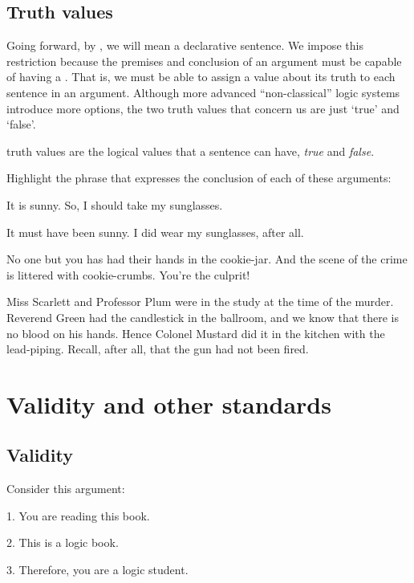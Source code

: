 \section{Truth values}
Going forward, by , we will mean a declarative sentence. We impose this restriction because the premises and conclusion of an argument must be capable of having a . That is, we must be able to assign a value about its truth to each sentence in an argument. Although more advanced ``non-classical'' logic systems introduce more options, the two truth values that concern us are just `true' and `false'. 

\begin{factboxy}{truth values}
 are the logical values that a sentence can have, \textit{true} and \textit{false}.
\end{factboxy}

\practiceproblems

\noindent Highlight the phrase that expresses the conclusion of each of these arguments:
\begin{earg}
	\item It is sunny. So, I should take my sunglasses.
	\item It must have been sunny. I did wear my sunglasses, after all.
	\item No one but you has had their hands in the cookie-jar. And the scene of the crime is littered with cookie-crumbs. You're the culprit!
	\item Miss Scarlett and Professor Plum were in the study at the time of the murder. Reverend Green had the candlestick in the ballroom, and we know that there is no blood on his hands. Hence Colonel Mustard did it in the kitchen with the lead-piping. Recall, after all, that the gun had not been fired.
\end{earg}




\chapter{Validity and other standards}\label{s:Valid}

\section{Validity}\label{s:Valid-def}

Consider this argument:
	\begin{earg}
		\item[1.] You are reading this book.
		\item[2.] This is a logic book.
		\item[3.] Therefore, you are a logic student.
	\end{earg}

